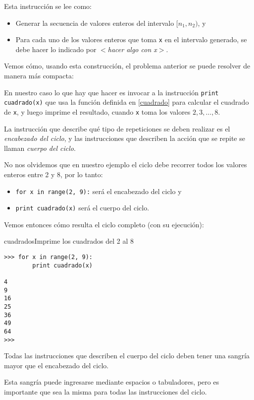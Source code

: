 Esta instrucción se lee como:

\begin{itemize}
\item Generar la secuencia de valores enteros del intervalo $[n_1, n_2)$, y
\item Para cada uno de los valores enteros que toma \verb+x+ en el intervalo generado,
se debe hacer lo indicado por {\it $<$hacer algo con x$>$}.
\end{itemize}

Vemos cómo, usando esta construcción, el problema anterior se puede resolver
de manera más compacta:

\begin{solucion} En nuestro caso lo que hay que hacer es invocar a la
instrucción \lstinline!print cuadrado(x)!  que usa la función definida en
\ref{cuadrado} para calcular el cuadrado de \lstinline!x!, y luego imprime el
resultado, cuando \lstinline!x! toma los valores $2, 3, \ldots, 8$.

La instrucción que describe qué tipo de repeticiones se deben
realizar es el {\it encabezado del ciclo}, y las instrucciones que
describen la acción que se repite se llaman {\it cuerpo del
ciclo}.

No nos olvidemos que en nuestro ejemplo el ciclo debe recorrer todos los valores
enteros entre 2 y 8, por lo tanto:

\begin{itemize}
\item \lstinline+for x in range(2, 9):+ será el encabezado del ciclo y
\item \lstinline+print cuadrado(x)+ será el cuerpo del ciclo.
\end{itemize}

Vemos entonces cómo resulta el ciclo completo (con su ejecución):

\begin{codigo}{cuadrados}{Imprime los cuadrados del 2 al 8}
\begin{lstlisting}[numbers=none]
>>> for x in range(2, 9):
        print cuadrado(x)

4
9
16
25
36
49
64
>>>
\end{lstlisting}
\end{codigo}
\end{solucion}

\begin{atencion}
Todas las instrucciones que describen el cuerpo del ciclo deben tener una
sangría mayor que el encabezado del ciclo.

Esta sangría puede ingresarse mediante espacios o tabuladores, pero es
importante que sea la misma para todas las instrucciones del ciclo.
\end{atencion}

